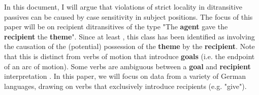 %
%
%
%
%
%
%
%
%
%
%
%
%
%
%
%
%
%


In this document, I will argue that violations of strict locality in ditransitive passives can be caused by case sensitivity in subject positions. The focus of this paper will be on recipient ditransitives of the type "The \textbf{agent} gave the \textbf{recipient} the \textbf{theme}". Since at least \cite{Oehrle.1976}, this class has been identified as involving the causation of the (potential) possession of the \textbf{theme} by the \textbf{recipient}. Note that this is distinct from verbs of motion that introduce \textbf{goals} (i.e. the endpoint of an arc of motion). Some verbs are ambiguous between a \textbf{goal} and \textbf{recipient} interpretation \citep{Hovav.2008}. In this paper, we will focus on data from a variety of German languages, drawing on verbs that exclusively introduce recipients (e.g. "give").

